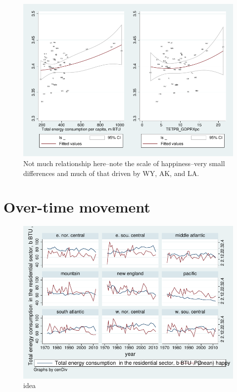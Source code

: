 \documentclass[10pt, letterpaper]{article}
\begin{document}
\begin{spacing}{1.4}
\begin{figure}[H]
 \includegraphics[width=6in]{graphsAndTables/lfTETPBgdpLS.pdf}\centering
\caption{Not much relationship here--note the scale of happiness--very small
  differences and much of that driven by WY, AK, and LA.}\label{lfTETPBgdpLS}
\end{figure}

\section{Over-time movement}

\begin{figure}[H]
 \includegraphics[width=6in]{graphsAndTables/cenDivLsYr.pdf}\centering
\caption{idea}\label{cenDivLsYr}
 \end{figure}


\end{spacing}
\end{document}
